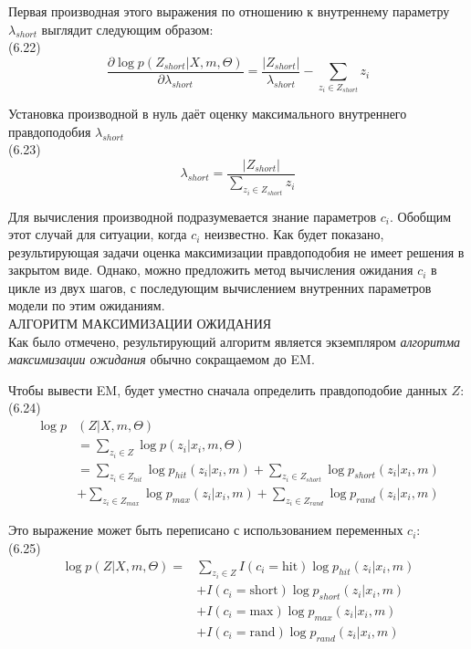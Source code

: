 \documentclass[10pt,a4paper]{article}
\begin{document}
Первая производная этого выражения по отношению к внутреннему параметру $\lambda_{short}$ выглядит следующим образом:\\

(6.22)
$$\frac{\partial\log p(Z_{short}|X,m,\varTheta)}{\partial\lambda_{short}}=\frac{|Z_{short}|}{\lambda_{short}}-\sum_{z_i\in Z_{short}}z_i$$

Установка производной в нуль даёт оценку максимального внутреннего правдоподобия $\lambda_{short}$\\

(6.23)
$$\lambda_{short}=\frac{|Z_{short}|}{\sum_{z_i\in Z_{short}}z_i}$$

Для вычисления производной подразумевается знание параметров $c_i$. Обобщим этот случай для ситуации, когда $c_i$ неизвестно. Как будет показано, результирующая задачи оценка максимизации правдоподобия не имеет решения в закрытом виде. Однако, можно предложить метод вычисления ожидания $c_i$ в цикле из двух шагов, с последующим вычислением внутренних параметров модели по этим ожиданиям.\\ 
АЛГОРИТМ МАКСИМИЗАЦИИ ОЖИДАНИЯ\\
Как было отмечено, результирующий алгоритм является экземпляром \textit{алгоритма максимизации ожидания} обычно сокращаемом до EM.

Чтобы вывести EM, будет уместно сначала определить правдоподобие данных $Z$:\\

(6.24)
\begin{equation*}
\begin{split}
\log p&(Z|X,m,\varTheta)\\
&=\sum_{z_i\in Z}\log p(z_i|x_i,m,\varTheta)\\
&=\sum_{z_i\in Z_{hit}}\log p_{hit}(z_i|x_i,m)+\sum_{z_i\in Z_{short}}\log p_{short}(z_i|x_i,m)\\
&+\sum_{z_i\in Z_{max}}\log p_{max}(z_i|x_i,m)+\sum_{z_i\in Z_{rand}}\log p_{rand}(z_i|x_i,m)
\end{split}
\end{equation*}

Это выражение может быть переписано с использованием переменных $c_i$:\\

(6.25)
\begin{equation*}
\begin{split}
\log p(Z|X,m,\varTheta)=&\sum_{z_i\in Z}I(c_i=\text{hit})\log p_{hit}(z_i|x_i,m)\\
&+I(c_i=\text{short})\log p_{short}(z_i|x_i,m)\\
&+I(c_i=\text{max})\log p_{max}(z_i|x_i,m)\\
&+I(c_i=\text{rand})\log p_{rand}(z_i|x_i,m)
\end{split}
\end{equation*}
\end{document}

